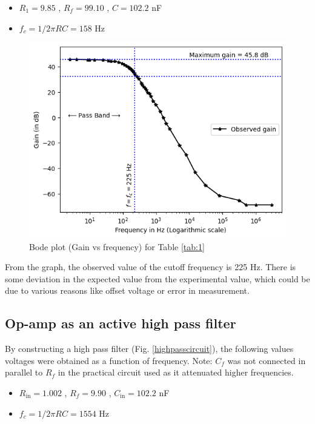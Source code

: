     \begin{itemize}
        \item $R_1 = 9.85$ \kohm, $R_f = 99.10$ \kohm, $C = 102.2$ nF
        \item $f_c=1/2 \pi RC=158$ Hz\\
    \end{itemize}
    
    
    
    \begin{figure}[H]
        \centering
        \includegraphics[width=0.81\columnwidth]{images/low_pass_output.png}
        \caption{Bode plot (Gain vs frequency) for Table \ref{tab:1}}
        \label{lowoutput}
    \end{figure}

From the graph, the observed value of the cutoff frequency is 225 Hz. There is some deviation in the expected value from the experimental value, which could be due to various reasons like offset voltage or error in measurement.

\subsection{Op-amp as an active high pass filter}
By constructing a high pass filter (Fig. \ref{highpasscircuit}), the following values voltages were obtained as a function of frequency. Note: $C_f$ was not connected in parallel to $R_f$ in the practical circuit used as it attenuated higher frequencies. 

    \begin{itemize}
        \item $R_\text{in} = 1.002$ \kohm, $R_f = 9.90$ \kohm, $C_\text{in} = 102.2$ nF
        \item $f_c=1/2 \pi RC=1554$ Hz\\
    \end{itemize}

